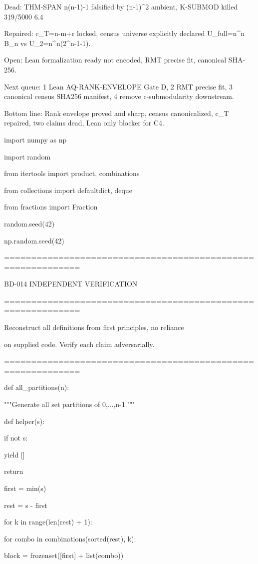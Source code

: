 Dead: THM-SPAN n(n-1)-1 falsified by (n-1)^2 ambient, K-SUBMOD killed 319/5000 6.4%

Repaired: c_T=n-m+r locked, census universe explicitly declared U_full=n^n B_n vs U_2=n^n(2^{n-1}-1).

Open: Lean formalization ready not encoded, RMT precise fit, canonical SHA-256.

Next queue: 1 Lean AQ-RANK-ENVELOPE Gate D, 2 RMT precise fit, 3 canonical census SHA256 manifest, 4 remove c-submodularity downstream.

Bottom line: Rank envelope proved and sharp, census canonicalized, c_T repaired, two claims dead, Lean only blocker for C4.

import numpy as np

import random

from itertools import product, combinations

from collections import defaultdict, deque

from fractions import Fraction


random.seed(42)

np.random.seed(42)


============================================================


BD-014 INDEPENDENT VERIFICATION


============================================================


Reconstruct all definitions from first principles, no reliance


on supplied code. Verify each claim adversarially.


============================================================


def all_partitions(n):

"""Generate all set partitions of {0,...,n-1}."""

def helper(s):

if not s:

yield []

return

first = min(s)

rest = s - {first}

for k in range(len(rest) + 1):

for combo in combinations(sorted(rest), k):

block = frozenset([first] + list(combo))

